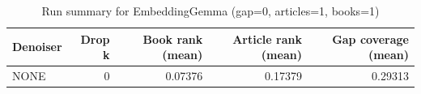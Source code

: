 \begin{table}
\caption{Run summary for EmbeddingGemma (gap=0, articles=1, books=1)}
\label{tab:summary_gap0_embeddinggemma_a1_b1}
\begin{tabular}{lrrrr}
\toprule
Denoiser & Drop k & Book rank (mean) & Article rank (mean) & Gap coverage (mean) \\
\midrule
NONE & 0 & 0.07376 & 0.17379 & 0.29313 \\
\bottomrule
\end{tabular}
\end{table}